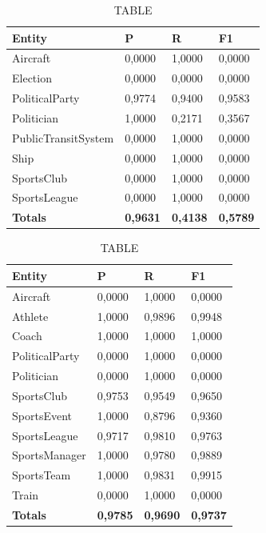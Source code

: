 \documentclass[thesis=M,english]{FITthesis}[2018/05/30]
\begin{document}
	\begin{table}[H]\centering
		\caption{TABLE}
		\label{}
		\begin{tabular}{|l|l|l|l|}
			\hline {\textbf{Entity}} & {\textbf{P}} & {\textbf{R}} & {\textbf{F1}}\\\hline
				Aircraft & 0,0000 & 1,0000 & 0,0000\\				
				Election & 0,0000 & 0,0000 & 0,0000\\
				PoliticalParty & 0,9774 & 0,9400 & 0,9583\\
				Politician & 1,0000 & 0,2171 & 0,3567\\
				PublicTransitSystem & 0,0000 & 1,0000 & 0,0000\\
				Ship & 0,0000 & 1,0000 & 0,0000\\
				SportsClub & 0,0000 & 1,0000 & 0,0000\\
				SportsLeague & 0,0000 & 1,0000 & 0,0000\\\hline
				\textbf{Totals} & \textbf{0,9631} & \textbf{0,4138} & \textbf{0,5789}\\\hline
		\end{tabular}
	\end{table}	

	\begin{table}[H]\centering
		\caption{TABLE}
		\label{}
		\begin{tabular}{|l|l|l|l|}
			\hline {\textbf{Entity}} & {\textbf{P}} & {\textbf{R}} & {\textbf{F1}}\\\hline
				Aircraft & 0,0000 & 1,0000 & 0,0000\\
				Athlete & 1,0000 & 0,9896 & 0,9948\\
				Coach & 1,0000 & 1,0000 & 1,0000\\
				PoliticalParty & 0,0000 & 1,0000 & 0,0000\\
				Politician & 0,0000 & 1,0000 & 0,0000\\
				SportsClub & 0,9753 & 0,9549 & 0,9650\\
				SportsEvent & 1,0000 & 0,8796 & 0,9360\\
				SportsLeague & 0,9717 & 0,9810 & 0,9763\\
				SportsManager & 1,0000 & 0,9780 & 0,9889\\				
				SportsTeam & 1,0000 & 0,9831 & 0,9915\\
				Train & 0,0000 & 1,0000 & 0,0000\\\hline
				\textbf{Totals} & \textbf{0,9785} & \textbf{0,9690} & \textbf{0,9737}\\\hline
		\end{tabular}
	\end{table}	
\end{document}
